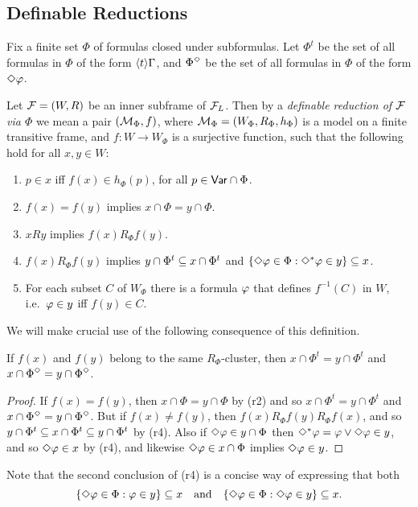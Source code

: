 \subsection{Definable Reductions}
Fix a finite set $\Phi$ of formulas closed under subformulas.
Let $\Phi^t$ be the set of all formulas in $\Phi$ of the form $\langle t\rangle\Gamma$, and
$\Phi^\Diamond$ be the set of all formulas in $\Phi$ of the form $\Diamond\varphi$.


Let $\mathcal{F}=(W,R)$ be an inner subframe of $\mathcal{F}_L$. Then by a \emph{definable reduction of $\mathcal{F}$ via $\Phi$} we mean a pair $(\mathcal{M}_\Phi,f)$,  where $\mathcal{M}_\Phi=(W_\Phi,R_\Phi,h_\Phi)$ is a model on a finite transitive frame, and $f:W\to W_\Phi$
is a surjective function, such that the following hold for all $x,y\in W$:

\begin{enumerate}[(r1):]
\item 
$p\in x$ iff $f(x)\in h_\Phi(p)$, for all $p\in\mathsf{Var}\cap\Phi$.
\item
$f(x)=f(y)$ implies $x\cap\Phi= y\cap\Phi$.
\item
$xRy$ implies $f(x)R_\Phi f(y)$.
\item
$f(x)R_\Phi f(y)$ implies  $y\cap \Phi^t\subseteq x\cap\Phi^t$ and 
$\{\Diamond\varphi\in\Phi:\Diamond^*\varphi\in y\}\subseteq x$.
\item 
For each subset $C$ of $W_\Phi$ there is a formula $\varphi$ that defines $f^{-1}(C)$ in $W$, i.e.\ $\varphi\in y$ iff $f(y)\in C$.
\end{enumerate}
We will make crucial use of the following  consequence of this definition.

\begin{lemma} \label{import}
If $f(x)$ and $f(y)$ belong to the same $R_\Phi$-cluster, then $x\cap\Phi^t=y\cap\Phi^t$ and $x\cap\Phi^\Diamond=y\cap\Phi^\Diamond$.
\end{lemma}
\begin{proof}
If $f(x)=f(y)$, then $x\cap\Phi=y\cap\Phi$ by (r2) and so $x\cap\Phi^t=y\cap\Phi^t$ and $x\cap\Phi^\Diamond=y\cap\Phi^\Diamond$. But if  $f(x)\ne f(y)$, then $ f(x)R_\Phi f(y)R_\Phi f(x)$, and so 
 $y\cap \Phi^t\subseteq x\cap\Phi^t\subseteq y\cap\Phi^t$ by (r4).  Also if
 $\Diamond\varphi\in y\cap \Phi$ then $\Diamond^*\varphi=\varphi\lor\Diamond\varphi\in y$, and so $\Diamond\varphi\in x$ by (r4), and likewise $\Diamond\varphi\in x\cap \Phi$ implies
 $\Diamond\varphi\in y$.
\end{proof}
Note that the second conclusion of (r4) is a concise way of expressing that both 
$$
\{\Diamond\varphi\in\Phi:\varphi\in y\}\subseteq x\quad\text{and}\quad 
\{\Diamond\varphi\in\Phi:\Diamond\varphi\in y\}\subseteq x.
$$

